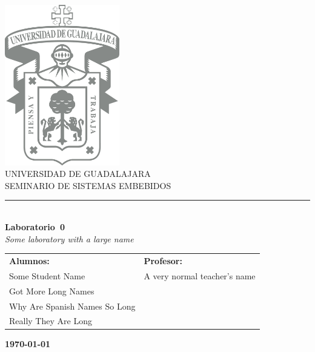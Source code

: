 \documentclass[12pt]{article}
\newcommand{\experimentname}{Some laboratory with a large name}
\newcommand{\kinofreport}{Laboratorio}
\newcommand{\experimentnumber}{0}
\newcommand{\subjectname}{SEMINARIO DE SISTEMAS EMBEBIDOS}
\newcommand{\teamnamesone}{Some Student Name}
\newcommand{\teamnamestwo}{Got More Long Names}
\newcommand{\teamnamesthree}{Why Are Spanish Names So Long}
\newcommand{\teamnamesfour}{Really They Are Long}
\newcommand{\professorname}{A very normal teacher's name}
\begin{document}
    \begin{titlepage}
        \begin{center}
            \includegraphics[width=5cm]{data/private_img/udg-logo.png}\\
            \vspace{1.2cm}
            \huge{UNIVERSIDAD DE GUADALAJARA}\\
            \Large{\subjectname}\\
            \rule{16cm}{0.8pt}\\
            \vspace{0.7cm}
            \Large{\textbf{\kinofreport\ \experimentnumber}\\\LARGE{\textit{\experimentname}}}
        \end{center}
        \vspace{1cm}
        \begin{center}
            \begin{tabular}{p{8cm}p{6cm}}
                \textbf{Alumnos:} & \textbf{Profesor:}\\
                \teamnamesone & \professorname\\
                \teamnamestwo & \\
                \teamnamesthree & \\
                \teamnamesfour & 
            \end{tabular}
        \end{center}
        \vspace{3.1416cm}
        \begin{center}
            \textbf{\large{\today}}
        \end{center}
        
        
    \end{titlepage}
    \newpage
   
    
    
    \printbibliography
\end{document}
